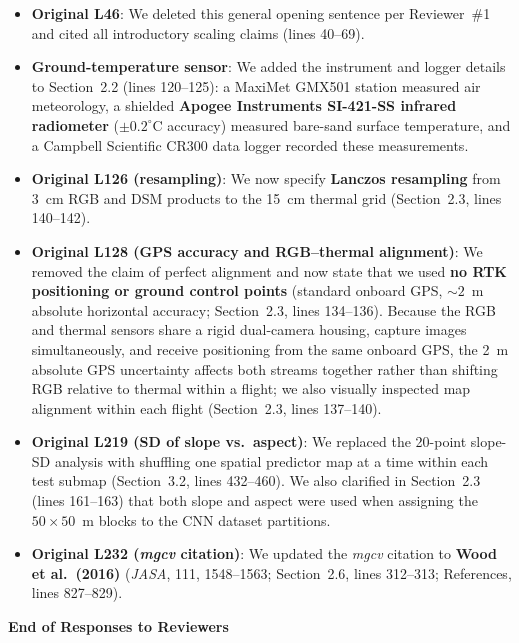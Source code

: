 \documentclass[12pt,english]{reviewresponse}
\begin{document}
\begin{revresponse}
\begin{itemize}[leftmargin=*, itemsep=0.2em]
    \item \textbf{Original L46}: We deleted this general opening sentence per Reviewer~\#1 and cited all introductory scaling claims (lines 40--69).
    \item \textbf{Ground-temperature sensor}: We added the instrument and logger details to Section~2.2 (lines 120--125): a MaxiMet GMX501 station measured air meteorology, a shielded \textbf{Apogee Instruments SI-421-SS infrared radiometer} ($\pm 0.2^\circ\mathrm{C}$ accuracy) measured bare-sand surface temperature, and a Campbell Scientific CR300 data logger recorded these measurements.
    \item \textbf{Original L126 (resampling)}: We now specify \textbf{Lanczos resampling} from 3~cm RGB and DSM products to the 15~cm thermal grid (Section~2.3, lines 140--142).
    \item \textbf{Original L128 (GPS accuracy and RGB--thermal alignment)}: We removed the claim of perfect alignment and now state that we used \textbf{no RTK positioning or ground control points} (standard onboard GPS, $\sim 2$~m absolute horizontal accuracy; Section~2.3, lines 134--136). Because the RGB and thermal sensors share a rigid dual-camera housing, capture images simultaneously, and receive positioning from the same onboard GPS, the 2~m absolute GPS uncertainty affects both streams together rather than shifting RGB relative to thermal within a flight; we also visually inspected map alignment within each flight (Section~2.3, lines 137--140).
    \item \textbf{Original L219 (SD of slope vs.\ aspect)}: We replaced the 20-point slope-SD analysis with shuffling one spatial predictor map at a time within each test submap (Section~3.2, lines 432--460). We also clarified in Section~2.3 (lines 161--163) that both slope and aspect were used when assigning the $50\times 50$~m blocks to the CNN dataset partitions.
    \item \textbf{Original L232 (\textit{mgcv} citation)}: We updated the \textit{mgcv} citation to \textbf{Wood et al.\ (2016)} (\textit{JASA}, 111, 1548--1563; Section~2.6, lines 312--313; References, lines 827--829).
\end{itemize}
\end{revresponse}

\vspace{1cm}
\begin{center}
\textbf{End of Responses to Reviewers}
\end{center}
\end{document}

